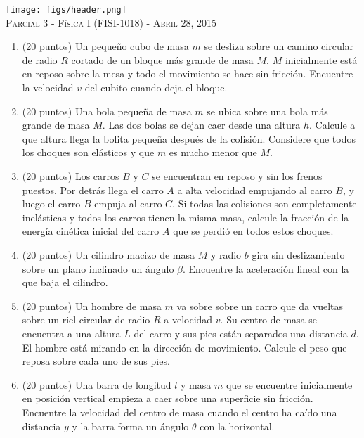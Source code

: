 \documentclass[letterpaper,10pt,onecolumn]{article}
\begin{document}
\thispagestyle{empty}
\begin{center}

\texttt{[image: figs/header.png]}\\[0.5cm]

\textsc{\LARGE Parcial 3 - F\'isica I (FISI-1018) - Abril 28, 2015}\\[0.5cm]


\end{center}

\begin{enumerate}

\item (20 puntos)
Un peque\~no cubo de masa $m$ se desliza sobre un camino circular de
radio $R$ cortado de un bloque m\'as grande de masa $M$. $M$
inicialmente est\'a en reposo sobre la mesa y todo el movimiento se
hace sin fricci\'on. Encuentre la velocidad $v$ del cubito cuando deja
el bloque.

\item (20 puntos)
Una bola peque\~na de masa $m$ se ubica sobre una bola m\'as
  grande de masa $M$. Las dos bolas se dejan caer desde una altura
  $h$. Calcule a que altura llega la bolita peque\~na despu\'es de la
  colisi\'on. Considere que todos los choques son el\'asticos y que
  $m$ es mucho menor que $M$.

\item (20 puntos)
Los carros $B$ y $C$ se encuentran en reposo y sin los frenos
  puestos. Por detr\'as llega el carro $A$ a alta velocidad empujando
  al carro $B$, y luego el carro $B$ empuja al carro $C$. Si todas las
  colisiones son completamente inel\'asticas y todos los carros tienen
  la misma masa, calcule la fracci\'on de la energ\'ia cin\'etica
  inicial del carro $A$ que se perdi\'o en todos estos choques.  

\item (20 puntos)
Un cilindro macizo de masa $M$ y radio $b$ gira sin
  deslizamiento sobre un plano inclinado un \'angulo
  $\beta$. Encuentre la acelerac\'i\'on lineal con la que baja el
  cilindro. 

\item (20 puntos) Un hombre de masa $m$ va sobre sobre un carro que da vueltas
  sobre un riel circular de radio $R$ a velocidad $v$. Su centro de
  masa se encuentra a una altura $L$ del carro y sus pies est\'an
  separados una distancia $d$. El hombre est\'a mirando en la
  direcci\'on de movimiento. Calcule el peso que reposa sobre cada uno
  de sus pies.

\item (20 puntos) Una barra de longitud $l$ y masa $m$ que se
  encuentre inicialmente en posici\'on vertical empieza a caer sobre
  una superficie sin fricci\'on. Encuentre la velocidad del centro de
  masa cuando el centro ha ca\'ido una distancia $y$ y la barra forma
  un \'angulo $\theta$ con la horizontal.
\end{enumerate}
\end{document}
